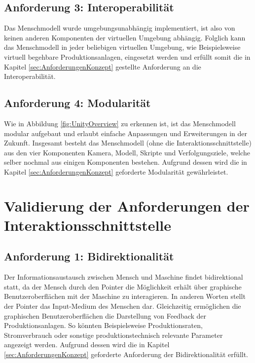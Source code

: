 \subsection{Anforderung 3: Interoperabilität}
Das Menschmodell wurde umgebungsunabhängig implementiert, ist also von keinen anderen Komponenten der virtuellen Umgebung abhängig. Folglich kann das Menschmodell in jeder beliebigen virtuellen Umgebung, wie Beispielsweise virtuell begehbare Produktionsanlagen, eingesetzt werden und erfüllt somit die in Kapitel \ref{sec:AnforderungenKonzept} gestellte Anforderung an die Interoperabilität.

\subsection{Anforderung 4: Modularität}
Wie in Abbildung \ref{fig:UnityOverview} zu erkennen ist, ist das Menschmodell modular aufgebaut und erlaubt einfache Anpassungen und Erweiterungen in der Zukunft. Insgesamt besteht das Menschmodell (ohne die Interaktionsschnittstelle) aus den vier Komponenten Kamera, Modell, Skripte und Verfolgungsziele, welche selber nochmal aus einigen Komponenten bestehen. Aufgrund dessen wird die in Kapitel \ref{sec:AnforderungenKonzept} geforderte Modularität gewährleistet.

\section{Validierung der Anforderungen der Interaktionsschnittstelle}\label{sec:ValidInteraktion}

\subsection{Anforderung 1: Bidirektionalität}
Der Informationsaustausch zwischen Mensch und Maschine findet bidirektional statt, da der Mensch durch den Pointer die Möglichkeit erhält über graphische Benutzeroberflächen mit der Maschine zu interagieren. In anderen Worten stellt der Pointer das Input-Medium des Menschen dar. Gleichzeitig ermöglichen die graphischen Benutzeroberflächen die Darstellung von Feedback der Produktionsanlagen. So könnten Beispielsweise Produktionsraten, Stromverbrauch oder sonstige produktionstechnisch relevante Parameter angezeigt werden. Aufgrund dessen wird die in Kapitel \ref{sec:AnforderungenKonzept} geforderte Anforderung der Bidirektionalität erfüllt.

